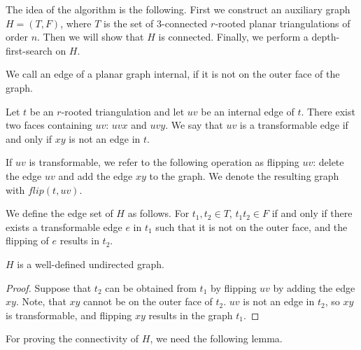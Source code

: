 The idea of the algorithm is the following. First we construct an auxiliary graph $H = (T, F)$, where
$T$ is the set of $3$-connected $r$-rooted planar triangulations of order $n$. Then we will
show that $H$ is connected. Finally, we perform a depth-first-search on $H$.

\begin{definition}
  We call an edge of a planar graph internal, if it is not on the outer face of the graph.

  Let $t$ be an $r$-rooted triangulation and let $uv$ be an internal edge of $t$. There exist two
  faces containing $uv$: $uvx$ and $uvy$. We say that $uv$ is a transformable edge
  if and only if $xy$ is not an edge in $t$.

  If $uv$ is transformable, we refer to the following operation as flipping $uv$:
  delete the edge $uv$ and add the edge $xy$ to the graph. We denote the resulting
  graph with $flip(t, uv)$.

  We define the edge set of $H$ as follows. For $t_1, t_2 \in T$, $t_1t_2 \in F$ if and only
  if there exists a transformable edge $e$ in $t_1$ such that it is not on the outer face,
  and the flipping of $e$ results in $t_2$.
\end{definition}

\begin{remark}
  $H$ is a well-defined undirected graph.
\end{remark}
\begin{proof}
  Suppose that $t_2$ can be obtained from $t_1$ by flipping
  $uv$ by adding the edge $xy$. Note, that $xy$ cannot be on the outer face of $t_2$.
  $uv$ is not an edge in $t_2$, so $xy$ is transformable, and flipping $xy$ results
  in the graph $t_1$.
\end{proof}

For proving the connectivity of $H$, we need the following lemma.

